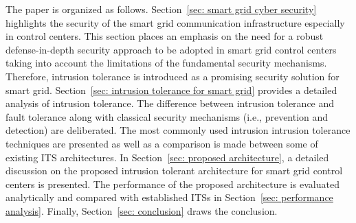 \documentclass[preprint,number,12pt]{elsarticle}
\begin{document}
The paper is organized as follows. Section~\ref{sec: smart grid cyber security} highlights the security of the smart grid communication infrastructure especially in control centers. This section places an emphasis on the need for a robust defense-in-depth security approach to be adopted in smart grid control centers taking into account the limitations of the fundamental security mechanisms. Therefore, intrusion tolerance is introduced as a promising security solution for smart grid. Section~\ref{sec: intrusion tolerance for smart grid} provides a detailed analysis of intrusion tolerance. The difference between intrusion tolerance and fault tolerance along with classical security mechanisms (i.e., prevention and detection) are deliberated. The most commonly used intrusion intrusion tolerance techniques are presented as well as a comparison is made between some of existing ITS architectures. In Section~\ref{sec: proposed architecture}, a detailed discussion on the proposed intrusion tolerant architecture for smart grid control centers is presented. The performance of the proposed architecture is evaluated analytically and compared with established ITSs in Section~\ref{sec: performance analysis}. Finally, Section~\ref{sec: conclusion} draws the conclusion.
\end{document}
